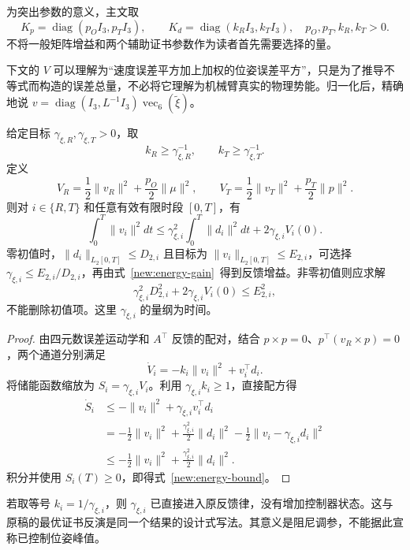 为突出参数的意义，主文取
\[
K_p=\operatorname{diag}(p_OI_3,p_TI_3),\qquad
K_d=\operatorname{diag}(k_RI_3,k_TI_3),
\quad p_O,p_T,k_R,k_T>0.
\]
不将一般矩阵增益和两个辅助证书参数作为读者首先需要选择的量。

下文的 $V$ 可以理解为“速度误差平方加上加权的位姿误差平方”，只是为了推导不等式而构造的误差总量，不必将它理解为机械臂真实的物理势能。归一化后，精确地说 $v=\operatorname{diag}(I_3,L^{-1}I_3)\operatorname{vec}_6(\widetilde\xi)$。

\begin{theorem}\label{new:energy}
给定目标 $\gamma_{\xi,R},\gamma_{\xi,T}>0$，取
\begin{equation}
\boxed{k_R\ge\gamma_{\xi,R}^{-1},\qquad
k_T\ge\gamma_{\xi,T}^{-1}.}
\label{new:energy-gain}
\end{equation}
定义
\[
V_R=\frac12\|v_R\|^2+\frac{p_O}{2}\|\mu\|^2,
\qquad
V_T=\frac12\|v_T\|^2+\frac{p_T}{2}\|p\|^2.
\]
则对 $i\in\{R,T\}$ 和任意有效有限时段 $[0,T]$，有
\begin{equation}
\boxed{\int_0^T\|v_i\|^2dt
\le\gamma_{\xi,i}^2\int_0^T\|d_i\|^2dt
+2\gamma_{\xi,i}V_i(0).}
\label{new:energy-bound}
\end{equation}
零初值时，$\|d_i\|_{L_2[0,T]}\le D_{2,i}$ 且目标为 $\|v_i\|_{L_2[0,T]}\le E_{2,i}$，可选择 $\gamma_{\xi,i}\le E_{2,i}/D_{2,i}$，再由式~\eqref{new:energy-gain}~得到反馈增益。非零初值则应求解
\[
\gamma_{\xi,i}^2D_{2,i}^2+2\gamma_{\xi,i}V_i(0)\le E_{2,i}^2,
\]
不能删除初值项。这里 $\gamma_{\xi,i}$ 的量纲为时间。
\end{theorem}

\begin{proof}
由四元数误差运动学和 $A^\top$ 反馈的配对，结合 $p\times p=0$、$p^\top(v_R\times p)=0$，两个通道分别满足
\[
\dot V_i=-k_i\|v_i\|^2+v_i^\top d_i.
\]
将储能函数缩放为 $S_i=\gamma_{\xi,i}V_i$。利用 $\gamma_{\xi,i}k_i\ge1$，直接配方得
\begin{align*}
\dot S_i
&\le-\|v_i\|^2+\gamma_{\xi,i}v_i^\top d_i\\
&=-\frac12\|v_i\|^2+\frac{\gamma_{\xi,i}^2}{2}\|d_i\|^2
-\frac12\|v_i-\gamma_{\xi,i}d_i\|^2\\
&\le-\frac12\|v_i\|^2+\frac{\gamma_{\xi,i}^2}{2}\|d_i\|^2.
\end{align*}
积分并使用 $S_i(T)\ge0$，即得式~\eqref{new:energy-bound}。
\end{proof}

\begin{remark}
若取等号 $k_i=1/\gamma_{\xi,i}$，则 $\gamma_{\xi,i}$ 已直接进入原反馈律，没有增加控制器状态。这与原稿的最优证书反演是同一个结果的设计式写法。其意义是阻尼调参，不能据此宣称已控制位姿峰值。
\end{remark}

